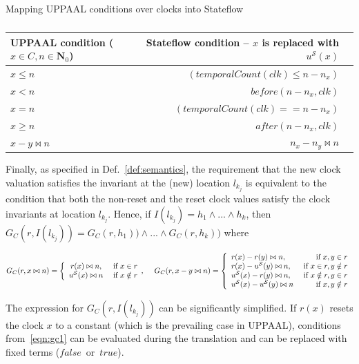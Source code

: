 \begin{table}[!t]
Mapping UPPAAL conditions over clocks into Stateflow{
\centering
\begin{tabular}{|l|r|r|}
\hline
UPPAAL condition ($x\in C,n\in \mathbf{N}_0$) & Stateflow condition --  $x$ is replaced with $u^\mathcal{S}(x)$ \\
\hline
$x\leq n$ &  $(temporalCount(clk)\leq n-n_x)$ \\
$x< n$  & $before(n-n_x,clk)$ \\
$x= n$   & $(temporalCount(clk)==n-n_x)$ \\
$x\geq n$  & $after(n-n_x,clk)$ \\
$x-y\bowtie n$  & $n_x-n_y\bowtie n$  \\
\hline
\end{tabular}
}
\caption{}
\label{tab:UP2SF_clocks}
\end{table}



Finally, as specified in Def.~\ref{def:semantics}, the requirement that the new clock valuation satisfies the invariant at the (new) location $l_{k_j}$ is equivalent to the condition that both the non-reset and the reset clock values satisfy the clock invariants at location $l_{k_j}$. Hence, if $I(l_{k_j})=h_1\wedge ...\wedge h_k$, then $G_C(r,I(l_{k_j}))=G_C(r,h_1))\wedge...\wedge G_C(r,h_k))$ where

\footnotesize
\vspace{-10pt}
\begin{equation}
\label{eqn:gc1}
G_C(r,x\bowtie n) = \left\{
\begin{array}{cc} 
r(x)\bowtie n, & \hbox{ if } x\in r\\
u^\mathcal{S}(x)\bowtie n & \hbox{ if } x\notin r 				
\end{array},
\right. 
\hspace{10pt}
G_C(r,x-y\bowtie n) = 
\left\{
\begin{array}{lr} 
r(x)-r(y)\bowtie n, & \hbox{ if } x,y\in r\\
r(x)-u^\mathcal{S}(y)\bowtie n, & \hbox{ if } x\in r,y\notin r\\
u^\mathcal{S}(x)-r(y)\bowtie n, & \hbox{ if } x\notin r,y\in r\\
u^\mathcal{S}(x)-u^\mathcal{S}(y)\bowtie n & \hbox{ if } x,y\notin r													  
\end{array}
\right.
\end{equation}
\normalsize

\noindent 
The expression for $G_C(r,I(l_{k_j}))$ can be significantly simplified. If $r(x)$ resets the clock $x$ to a constant (which is the prevailing case in UPPAAL), conditions from~\eqref{eqn:gc1} can be evaluated during the translation and can be replaced with fixed terms ($false$~or~$true$).



